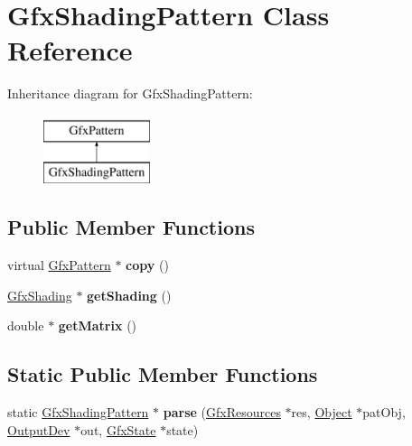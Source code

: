 \hypertarget{class_gfx_shading_pattern}{}\section{Gfx\+Shading\+Pattern Class Reference}
\label{class_gfx_shading_pattern}
Inheritance diagram for Gfx\+Shading\+Pattern\+:\begin{figure}[H]
\begin{center}
\leavevmode
\includegraphics[height=2.000000cm]{class_gfx_shading_pattern}
\end{center}
\end{figure}
\subsection*{Public Member Functions}
\begin{DoxyCompactItemize}
\item 
\mbox{\label{class_gfx_shading_pattern_a0af8bd361fdbef3350e4ebaf582841b6}} 
virtual \hyperlink{class_gfx_pattern}{Gfx\+Pattern} $\ast$ {\bfseries copy} ()
\item 
\mbox{\label{class_gfx_shading_pattern_a2ea8c35471632c5dc939a798313d7a74}} 
\hyperlink{class_gfx_shading}{Gfx\+Shading} $\ast$ {\bfseries get\+Shading} ()
\item 
\mbox{\label{class_gfx_shading_pattern_a5ea5f0ab7a8297449d8c8e8550ed3e40}} 
double $\ast$ {\bfseries get\+Matrix} ()
\end{DoxyCompactItemize}
\subsection*{Static Public Member Functions}
\begin{DoxyCompactItemize}
\item 
\mbox{\label{class_gfx_shading_pattern_a339064793087642855ba789081f2c03c}} 
static \hyperlink{class_gfx_shading_pattern}{Gfx\+Shading\+Pattern} $\ast$ {\bfseries parse} (\hyperlink{class_gfx_resources}{Gfx\+Resources} $\ast$res, \hyperlink{class_object}{Object} $\ast$pat\+Obj, \hyperlink{class_output_dev}{Output\+Dev} $\ast$out, \hyperlink{class_gfx_state}{Gfx\+State} $\ast$state)
\end{DoxyCompactItemize}


